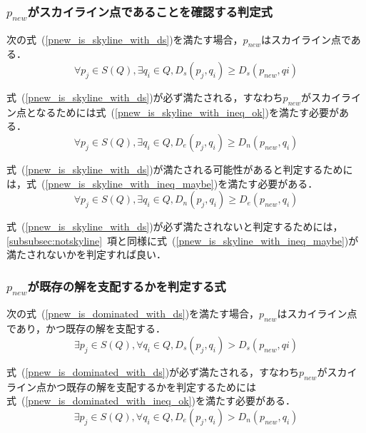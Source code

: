 \documentclass{fit}
\theoremstyle{definition}
\newcommand{\Subsubsec}[1]{#1~項}
\newcommand{\Eq}[1]{式~(#1)}
\begin{document}
\subsubsection{$p_{new}$がスカイライン点であることを確認する判定式}

次の\Eq{\ref{pnew_is_skyline_with_ds}}を満たす場合，$p_{new}$はスカイライン点である．
\begin{equation}
  \label{pnew_is_skyline_with_ds}
  \forall p_j \in S(Q), \exists q_i \in Q, D_s(p_j, q_i) \geq D_s(p_{new}, qi)
\end{equation}

\Eq{\ref{pnew_is_skyline_with_ds}}が必ず満たされる，すなわち$p_{new}$がスカイライン点となるためには\Eq{\ref{pnew_is_skyline_with_ineq_ok}}を満たす必要がある．
\begin{equation}
  \label{pnew_is_skyline_with_ineq_ok}
  \forall p_j \in S(Q), \exists q_i \in Q, D_e(p_j, q_i) \geq D_n(p_{new}, q_i)
\end{equation}

\Eq{\ref{pnew_is_skyline_with_ds}}が満たされる可能性があると判定するためには，\Eq{\ref{pnew_is_skyline_with_ineq_maybe}}を満たす必要がある．
\begin{equation}
  \label{pnew_is_skyline_with_ineq_maybe}
  \forall p_j \in S(Q), \exists q_i \in Q, D_n(p_j, q_i) \geq D_e(p_{new}, q_i)
\end{equation}

\Eq{\ref{pnew_is_skyline_with_ds}}が必ず満たされないと判定するためには，\Subsubsec{\ref{subsubsec:notskyline}}と同様に\Eq{\ref{pnew_is_skyline_with_ineq_maybe}}が満たされないかを判定すれば良い．

\subsubsection{$p_{new}$が既存の解を支配するかを判定する式}
次の\Eq{\ref{pnew_is_dominated_with_ds}}を満たす場合，$p_{new}$はスカイライン点であり，かつ既存の解を支配する．
\begin{equation}
  \label{pnew_is_dominated_with_ds}
  \exists p_j \in S(Q), \forall q_i \in Q, D_s(p_j, q_i) > D_s(p_{new}, qi)
\end{equation}

\Eq{\ref{pnew_is_dominated_with_ds}}が必ず満たされる，すなわち$p_{new}$がスカイライン点かつ既存の解を支配するかを判定するためには\Eq{\ref{pnew_is_dominated_with_ineq_ok}}を満たす必要がある．
\begin{equation}
  \label{pnew_is_dominated_with_ineq_ok}
  \exists p_j \in S(Q), \forall q_i \in Q, D_e(p_j, q_i) > D_n(p_{new}, q_i)
\end{equation}
\end{document}
